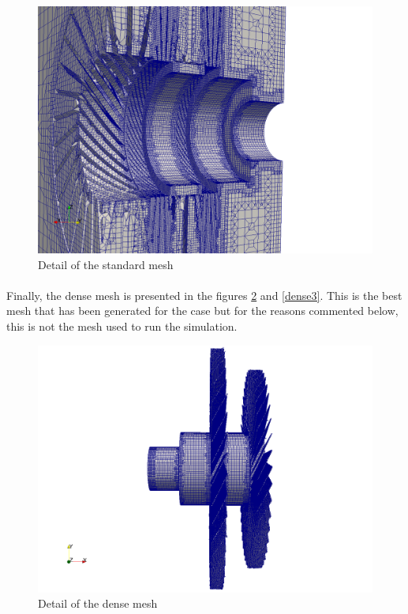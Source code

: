 \begin{figure}[h!]
\includegraphics[scale=0.24]{./mesh/newmesh/std2}
\centering
\caption{Detail of the standard mesh}
\label{standard2}
\end{figure}

\newpage{}

\paragraph{}Finally, the dense mesh is presented in the figures \ref{dense2} and \ref{dense3}. This is the best mesh that has been generated for the case but for the reasons commented below, this is not the mesh used to run the simulation.

\begin{figure}[h!]
\includegraphics[scale=0.24]{./mesh/newmesh/dense1}
\centering
\caption{Detail of the dense mesh}
\label{dense2}
\end{figure}

